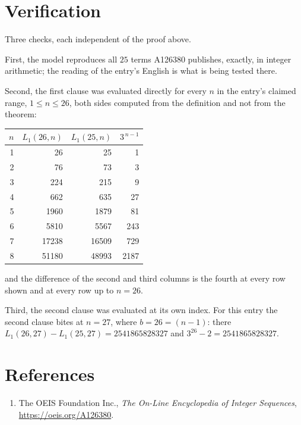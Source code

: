 \documentclass[11pt,a4paper]{article}
\theoremstyle{plain}
\theoremstyle{definition}
\begin{document}
\section{Verification}

Three checks, each independent of the proof above.

First, the model reproduces all $25$ terms A126380 publishes, exactly, in integer
arithmetic; the reading of the entry's English is what is being tested there.

Second, the first clause was evaluated directly for every $n$ in the entry's claimed range,
$1\le n\le26$, both sides computed from the definition and not from the theorem:

\begin{center}
\begin{tabular}{rrrr}
$n$ & $L_{1}(26,n)$ & $L_{1}(25,n)$ & $3^{\,n-1}$ \\ \hline
1 & 26 & 25 & 1 \\
2 & 76 & 73 & 3 \\
3 & 224 & 215 & 9 \\
4 & 662 & 635 & 27 \\
5 & 1960 & 1879 & 81 \\
6 & 5810 & 5567 & 243 \\
7 & 17238 & 16509 & 729 \\
8 & 51180 & 48993 & 2187 \\
\end{tabular}
\end{center}

\noindent and the difference of the second and third columns is the fourth at every row shown
and at every row up to $n=26$.

Third, the second clause was evaluated at its own index. For this entry the second clause bites at $n=27$, where $b=26=(n-1)$: there $L_{1}(26,27)-L_{1}(25,27)=2541865828327$ and $3^{26}-2=2541865828327$.

\section*{References}
\begin{enumerate}
\item The OEIS Foundation Inc., \emph{The On-Line Encyclopedia of Integer Sequences},
\url{https://oeis.org/A126380}.
\end{enumerate}
\end{document}
